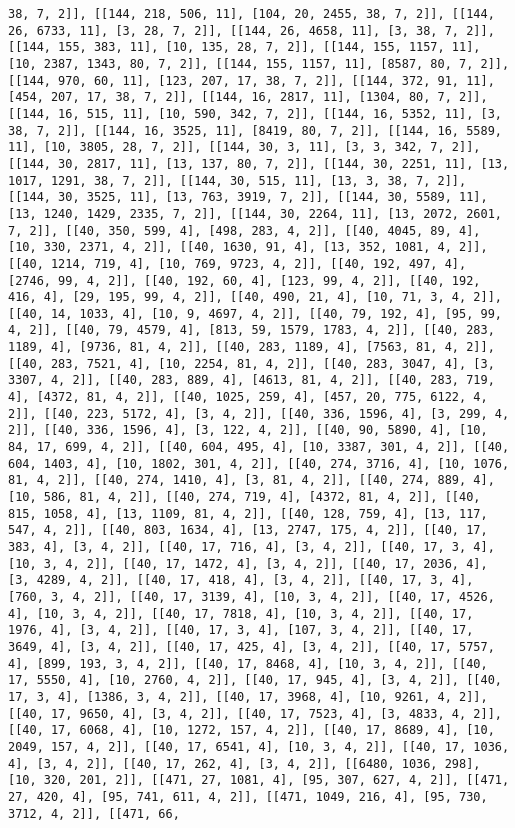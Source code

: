 \documentclass[12pt,fleqn]{article}\usepackage{../../common}
\begin{document}
\begin{verbatim}
38, 7, 2]], [[144, 218, 506, 11], [104, 20, 2455, 38, 7, 2]], [[144, 26, 6733, 11], [3, 28, 7, 2]], [[144, 26, 4658, 11], [3, 38, 7, 2]], [[144, 155, 383, 11], [10, 135, 28, 7, 2]], [[144, 155, 1157, 11], [10, 2387, 1343, 80, 7, 2]], [[144, 155, 1157, 11], [8587, 80, 7, 2]], [[144, 970, 60, 11], [123, 207, 17, 38, 7, 2]], [[144, 372, 91, 11], [454, 207, 17, 38, 7, 2]], [[144, 16, 2817, 11], [1304, 80, 7, 2]], [[144, 16, 515, 11], [10, 590, 342, 7, 2]], [[144, 16, 5352, 11], [3, 38, 7, 2]], [[144, 16, 3525, 11], [8419, 80, 7, 2]], [[144, 16, 5589, 11], [10, 3805, 28, 7, 2]], [[144, 30, 3, 11], [3, 3, 342, 7, 2]], [[144, 30, 2817, 11], [13, 137, 80, 7, 2]], [[144, 30, 2251, 11], [13, 1017, 1291, 38, 7, 2]], [[144, 30, 515, 11], [13, 3, 38, 7, 2]], [[144, 30, 3525, 11], [13, 763, 3919, 7, 2]], [[144, 30, 5589, 11], [13, 1240, 1429, 2335, 7, 2]], [[144, 30, 2264, 11], [13, 2072, 2601, 7, 2]], [[40, 350, 599, 4], [498, 283, 4, 2]], [[40, 4045, 89, 4], [10, 330, 2371, 4, 2]], [[40, 1630, 91, 4], [13, 352, 1081, 4, 2]], [[40, 1214, 719, 4], [10, 769, 9723, 4, 2]], [[40, 192, 497, 4], [2746, 99, 4, 2]], [[40, 192, 60, 4], [123, 99, 4, 2]], [[40, 192, 416, 4], [29, 195, 99, 4, 2]], [[40, 490, 21, 4], [10, 71, 3, 4, 2]], [[40, 14, 1033, 4], [10, 9, 4697, 4, 2]], [[40, 79, 192, 4], [95, 99, 4, 2]], [[40, 79, 4579, 4], [813, 59, 1579, 1783, 4, 2]], [[40, 283, 1189, 4], [9736, 81, 4, 2]], [[40, 283, 1189, 4], [7563, 81, 4, 2]], [[40, 283, 7521, 4], [10, 2254, 81, 4, 2]], [[40, 283, 3047, 4], [3, 3307, 4, 2]], [[40, 283, 889, 4], [4613, 81, 4, 2]], [[40, 283, 719, 4], [4372, 81, 4, 2]], [[40, 1025, 259, 4], [457, 20, 775, 6122, 4, 2]], [[40, 223, 5172, 4], [3, 4, 2]], [[40, 336, 1596, 4], [3, 299, 4, 2]], [[40, 336, 1596, 4], [3, 122, 4, 2]], [[40, 90, 5890, 4], [10, 84, 17, 699, 4, 2]], [[40, 604, 495, 4], [10, 3387, 301, 4, 2]], [[40, 604, 1403, 4], [10, 1802, 301, 4, 2]], [[40, 274, 3716, 4], [10, 1076, 81, 4, 2]], [[40, 274, 1410, 4], [3, 81, 4, 2]], [[40, 274, 889, 4], [10, 586, 81, 4, 2]], [[40, 274, 719, 4], [4372, 81, 4, 2]], [[40, 815, 1058, 4], [13, 1109, 81, 4, 2]], [[40, 128, 759, 4], [13, 117, 547, 4, 2]], [[40, 803, 1634, 4], [13, 2747, 175, 4, 2]], [[40, 17, 383, 4], [3, 4, 2]], [[40, 17, 716, 4], [3, 4, 2]], [[40, 17, 3, 4], [10, 3, 4, 2]], [[40, 17, 1472, 4], [3, 4, 2]], [[40, 17, 2036, 4], [3, 4289, 4, 2]], [[40, 17, 418, 4], [3, 4, 2]], [[40, 17, 3, 4], [760, 3, 4, 2]], [[40, 17, 3139, 4], [10, 3, 4, 2]], [[40, 17, 4526, 4], [10, 3, 4, 2]], [[40, 17, 7818, 4], [10, 3, 4, 2]], [[40, 17, 1976, 4], [3, 4, 2]], [[40, 17, 3, 4], [107, 3, 4, 2]], [[40, 17, 3649, 4], [3, 4, 2]], [[40, 17, 425, 4], [3, 4, 2]], [[40, 17, 5757, 4], [899, 193, 3, 4, 2]], [[40, 17, 8468, 4], [10, 3, 4, 2]], [[40, 17, 5550, 4], [10, 2760, 4, 2]], [[40, 17, 945, 4], [3, 4, 2]], [[40, 17, 3, 4], [1386, 3, 4, 2]], [[40, 17, 3968, 4], [10, 9261, 4, 2]], [[40, 17, 9650, 4], [3, 4, 2]], [[40, 17, 7523, 4], [3, 4833, 4, 2]], [[40, 17, 6068, 4], [10, 1272, 157, 4, 2]], [[40, 17, 8689, 4], [10, 2049, 157, 4, 2]], [[40, 17, 6541, 4], [10, 3, 4, 2]], [[40, 17, 1036, 4], [3, 4, 2]], [[40, 17, 262, 4], [3, 4, 2]], [[6480, 1036, 298], [10, 320, 201, 2]], [[471, 27, 1081, 4], [95, 307, 627, 4, 2]], [[471, 27, 420, 4], [95, 741, 611, 4, 2]], [[471, 1049, 216, 4], [95, 730, 3712, 4, 2]], [[471, 66, 
\end{verbatim}
\end{document}
